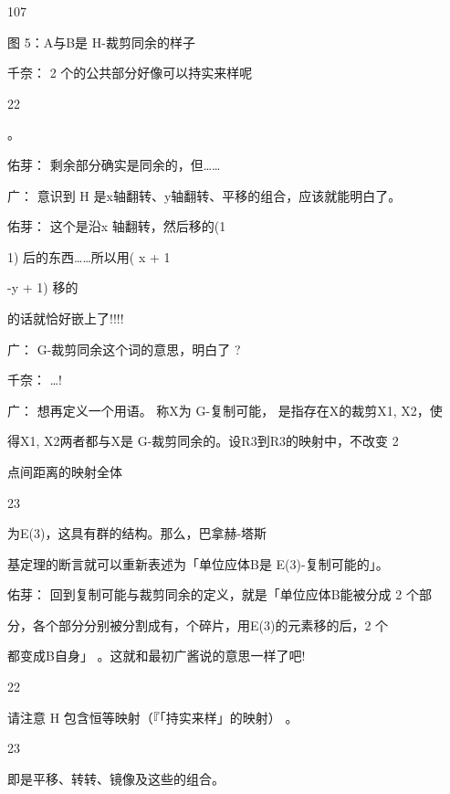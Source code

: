 107\par
图 5：A与B是 H-裁剪同余的样子\par
千奈： 2 个的公共部分好像可以持实来样呢\par
22\par
。\par
佑芽： 剩余部分确实是同余的，但……\par
广： 意识到 H 是x轴翻转、y轴翻转、平移的组合，应该就能明白了。\par
佑芽： 这个是沿x 轴翻转，然后移的(1\par
1) 后的东西……所以用( x + 1\par
-y + 1) 移的\par
的话就恰好嵌上了!!!!\par
广： G-裁剪同余这个词的意思，明白了 ?\par
千奈： …!\par
广： 想再定义一个用语。 称X为 G-复制可能， 是指存在X的裁剪X1, X2，使\par
得X1, X2两者都与X是 G-裁剪同余的。设R3到R3的映射中，不改变 2\par
点间距离的映射全体\par
23\par
为E(3)，这具有群的结构。那么，巴拿赫-塔斯\par
基定理的断言就可以重新表述为「单位应体B是 E(3)-复制可能的」。\par
佑芽： 回到复制可能与裁剪同余的定义，就是「单位应体B能被分成 2 个部\par
分，各个部分分别被分割成有，个碎片，用E(3)的元素移的后，2 个\par
都变成B自身」 。这就和最初广酱说的意思一样了吧!\par
22\par
请注意 H 包含恒等映射（『「持实来样」的映射） 。\par
23\par
即是平移、转转、镜像及这些的组合。\par

